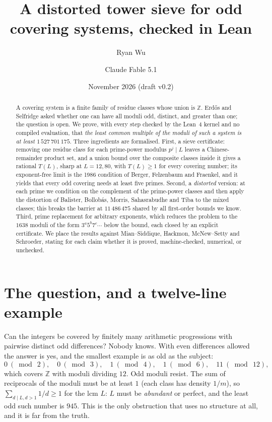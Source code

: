 \documentclass[11pt]{article}
\title{A distorted tower sieve for odd covering systems, checked in Lean}
\author{Ryan Wu \and Claude Fable 5.1}
\date{November 2026 (draft v0.2)}
\theoremstyle{definition}
\theoremstyle{remark}
\newcommand{\Z}{\mathbb{Z}}
\begin{document}
\maketitle

\begin{abstract}
A covering system is a finite family of residue classes whose union is $\Z$. Erd\H{o}s and Selfridge asked whether one can have all moduli odd, distinct, and greater than one; the question is open. We prove, with every step checked by the Lean~4 kernel and no compiled evaluation, that \emph{the least common multiple of the moduli of such a system is at least $1\,527\,701\,175$}. Three ingredients are formalised. First, a sieve certificate: removing one residue class for each prime-power modulus $p^j \mid L$ leaves a Chinese-remainder product set, and a union bound over the composite classes inside it gives a rational $T(L)$, sharp at $L = 12, 80$, with $T(L) \ge 1$ for every covering number; its exponent-free limit is the 1986 condition of Berger, Felzenbaum and Fraenkel, and it yields that every odd covering needs at least five primes. Second, a \emph{distorted} version: at each prime we condition on the complement of the prime-power classes and then apply the distortion of Balister, Bollob\'as, Morris, Sahasrabudhe and Tiba to the mixed classes; this breaks the barrier at $11\,486\,475$ shared by all first-order bounds we know. Third, prime replacement for arbitrary exponents, which reduces the problem to the $1638$ moduli of the form $3^a5^b7^c\cdots$ below the bound, each closed by an explicit certificate. We place the results against Mian--Siddique, Hackmon, McNew--Setty and Schroeder, stating for each claim whether it is proved, machine-checked, numerical, or unchecked.
\end{abstract}

\section{The question, and a twelve-line example}\label{sec:intro}

Can the integers be covered by finitely many arithmetic progressions with pairwise distinct odd differences? Nobody knows. With even differences allowed the answer is yes, and the smallest example is as old as the subject:
\[
0 \ (\bmod\ 2),\quad 0 \ (\bmod\ 3),\quad 1 \ (\bmod\ 4),\quad 1 \ (\bmod\ 6),\quad 11 \ (\bmod\ 12),
\]
which covers $\Z$ with moduli dividing $12$. Odd moduli resist. The sum of reciprocals of the moduli must be at least $1$ (each class has density $1/m$), so $\sum_{d \mid L, d > 1} 1/d \ge 1$ for the lcm $L$: $L$ must be \emph{abundant} or perfect, and the least odd such number is $945$. This is the only obstruction that uses no structure at all, and it is far from the truth.
\end{document}
